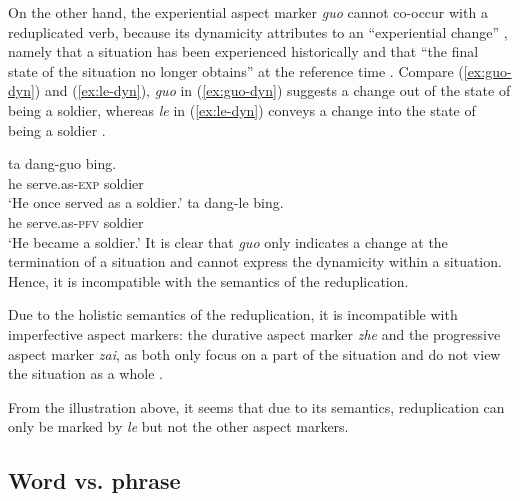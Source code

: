 On the other hand, the experiential aspect marker \textit{guo} cannot co\hyp{}occur with a reduplicated verb, 
because its dynamicity attributes to an ``experiential change'' \citep[148]{XiaoMcEnery2004}, 
namely that a situation has been experienced historically and that ``the final state of the situation no longer obtains'' at the reference time \citep[144]{XiaoMcEnery2004}. 
Compare (\ref{ex:guo-dyn}) and (\ref{ex:le-dyn}), \textit{guo} in (\ref{ex:guo-dyn}) suggests a change out of the state of being a soldier, 
whereas \textit{le} in (\ref{ex:le-dyn}) conveys a change into the state of being a soldier \citep[149]{XiaoMcEnery2004}.

\ea
  \ea\label{ex:guo-dyn}
    \gll ta dang-guo bing.\\
    he serve.as-\textsc{exp} soldier\\ 
    \glt `He once served as a soldier.'
  \ex\label{ex:le-dyn}
    \gll ta dang-le bing.\\
    he serve.as-\textsc{pfv} soldier\\ 
    \glt `He became a soldier.'
  \z
\z
It is clear that \textit{guo} only indicates a change at the termination of a situation and cannot express the dynamicity within a situation.
Hence, it is incompatible with the semantics of the reduplication.

Due to the holistic semantics of the reduplication, it is incompatible with imperfective aspect markers: the durative aspect marker \textit{zhe} and the progressive aspect marker \textit{zai}, as both only focus on  a part of the situation and do not view the situation as a whole \citep[Ch. 5]{XiaoMcEnery2004}.

From the illustration above, it seems that due to its semantics, reduplication can only be marked by \textit{le} but not the other aspect markers.








\subsection{Word vs. phrase}\label{sec:word}

